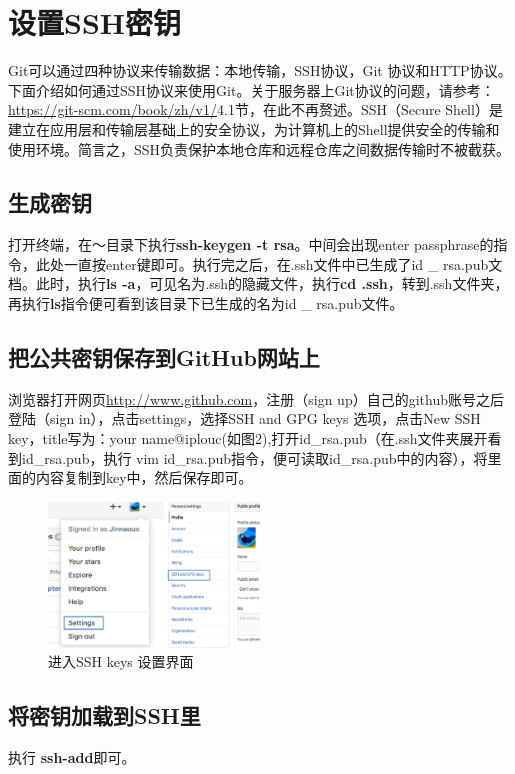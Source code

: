 \documentclass{article}
\begin{document}
\section{设置SSH密钥}
Git可以通过四种协议来传输数据：本地传输，SSH协议，Git 协议和HTTP协议。下面介绍如何通过SSH协议来使用Git。关于服务器上Git协议的问题，请参考：\url{https://git-scm.com/book/zh/v1/}4.1节，在此不再赘述。SSH（Secure Shell）是建立在应用层和传输层基础上的安全协议，为计算机上的Shell提供安全的传输和使用环境。简言之，SSH负责保护本地仓库和远程仓库之间数据传输时不被截获。

\subsection{生成密钥}
打开终端，在～目录下执行\textbf{ssh-keygen -t rsa}。中间会出现enter passphrase的指令，此处一直按enter键即可。执行完之后，在.ssh文件中已生成了id \_ rsa.pub文档。此时，执行\textbf{ls -a}，可见名为.ssh的隐藏文件，执行\textbf{cd .ssh}，转到.ssh文件夹，再执行\textbf{ls}指令便可看到该目录下已生成的名为id \_ rsa.pub文件。

\subsection{把公共密钥保存到GitHub网站上}
浏览器打开网页\url{http://www.github.com}，注册（sign up）自己的github账号之后登陆（sign in），点击settings，选择SSH and GPG keys 选项，点击New SSH key，title写为：your name@iplouc(如图2),打开id\_rsa.pub（在.ssh文件夹展开看到id\_rsa.pub，执行 vim id\_rsa.pub指令，便可读取id\_rsa.pub中的内容），将里面的内容复制到key中，然后保存即可。

\begin{figure}[!htb] %
\centering \includegraphics[width=0.5\textwidth]{fig2.png} \caption{进入SSH keys 设置界面}
\label{fig:1}
\end{figure}

\subsection{将密钥加载到SSH里}
执行 \textbf{ssh-add}即可。
\end{document}
